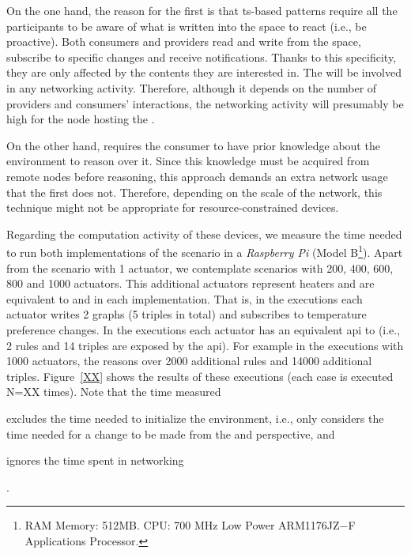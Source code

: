 On the one hand, the reason for the first is that \ac{ts}-based patterns require all the participants to be aware of what is written into the space to react (i.e., be proactive).
Both consumers and providers read and write from the space, subscribe to specific changes and receive notifications.
Thanks to this specificity, they are only affected by the contents they are interested in. %
The \Space{} will be involved in any networking activity.
Therefore, although it depends on the number of providers and consumers' interactions, the networking activity will presumably be high for the node hosting the \Space{}.


On the other hand, \restActuation{} requires the consumer to have prior knowledge about the environment to reason over it. %
Since this knowledge must be acquired from remote nodes before reasoning, this approach demands an extra network usage that the first does not.
Therefore, depending on the scale of the network, this technique might not be appropriate for resource-constrained devices.


\bigskip


Regarding the computation activity of these devices, we measure the time needed to run both implementations of the scenario in a \emph{Raspberry Pi} (Model B\footnote{RAM Memory: 512MB. \linebreak CPU: 700 MHz Low Power ARM1176JZ$-$F Applications Processor.}).
Apart from the scenario with 1 actuator, we contemplate scenarios with 200, 400, 600, 800 and 1000 actuators.
This additional actuators represent heaters and are equivalent to \nodeProvSpace{} and \nodeProvRest{} in each implementation.
That is, in the \spaceActuation{} executions each actuator writes 2 graphs (5 triples in total) and subscribes to temperature preference changes.
In the \restActuation{} executions each actuator has an equivalent \ac{api} to \nodeProvRest{} (i.e., 2 rules and 14 triples are exposed by the \ac{api}).
For example in the \nodeProvRest{} executions with 1000 actuators, the \nodeConsRest{} reasons over 2000 additional rules and 14000 additional triples.
Figure~\ref{XX} shows the results of these executions (each case is executed N=XX times).
Note that the time measured 
\begin{enumerate*}[label=\itshape\bfseries(\arabic*\upshape)]
  \item excludes the time needed to initialize the environment, i.e., only considers the time needed for a change to be made from the \nodeConsSpace{} and \nodeConsRest{}  perspective, and
  \item ignores the time spent in networking
\end{enumerate*}.

